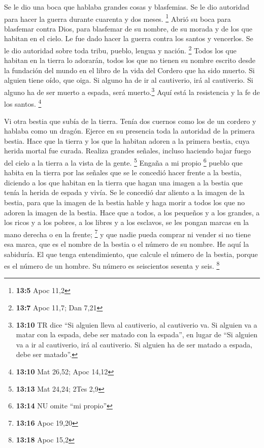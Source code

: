  Se le dio una boca que hablaba grandes cosas y
blasfemias. Se le dio autoridad para hacer la guerra durante cuarenta y
dos meses. \footnote{\textbf{13:5} Apoc 11,2}  Abrió su
boca para blasfemar contra Dios, para blasfemar de su nombre, de su
morada y de los que habitan en el cielo.  Le fue dado
hacer la guerra contra los santos y vencerlos. Se le dio autoridad sobre
toda tribu, pueblo, lengua y nación. \footnote{\textbf{13:7} Apoc 11,7;
  Dan 7,21}  Todos los que habitan en la tierra lo
adorarán, todos los que no tienen su nombre escrito desde la fundación
del mundo en el libro de la vida del Cordero que ha sido muerto.
 Si alguien tiene oído, que oiga.  Si
alguno ha de ir al cautiverio, irá al cautiverio. Si alguno ha de ser
muerto a espada, será muerto.\footnote{\textbf{13:10} TR dice ``Si
  alguien lleva al cautiverio, al cautiverio va. Si alguien va a matar
  con la espada, debe ser matado con la espada'', en lugar de ``Si
  alguien va a ir al cautiverio, irá al cautiverio. Si alguien ha de ser
  matado a espada, debe ser matado''.} Aquí está la resistencia y la fe
de los santos. \footnote{\textbf{13:10} Mat 26,52; Apoc 14,12}

 Vi otra bestia que subía de la tierra. Tenía dos cuernos
como los de un cordero y hablaba como un dragón.  Ejerce
en su presencia toda la autoridad de la primera bestia. Hace que la
tierra y los que la habitan adoren a la primera bestia, cuya herida
mortal fue curada.  Realiza grandes señales, incluso
haciendo bajar fuego del cielo a la tierra a la vista de la gente.
\footnote{\textbf{13:13} Mat 24,24; 2Tes 2,9}  Engaña a
mi propio \footnote{\textbf{13:14} NU omite ``mi propio''} pueblo que
habita en la tierra por las señales que se le concedió hacer frente a la
bestia, diciendo a los que habitan en la tierra que hagan una imagen a
la bestia que tenía la herida de espada y vivía.  Se le
concedió dar aliento a la imagen de la bestia, para que la imagen de la
bestia hable y haga morir a todos los que no adoren la imagen de la
bestia.  Hace que a todos, a los pequeños y a los
grandes, a los ricos y a los pobres, a los libres y a los esclavos, se
les pongan marcas en la mano derecha o en la frente; \footnote{\textbf{13:16}
  Apoc 19,20}  y que nadie pueda comprar ni vender si no
tiene esa marca, que es el nombre de la bestia o el número de su nombre.
 He aquí la sabiduría. El que tenga entendimiento, que
calcule el número de la bestia, porque es el número de un hombre. Su
número es seiscientos sesenta y seis. \footnote{\textbf{13:18} Apoc 15,2}

